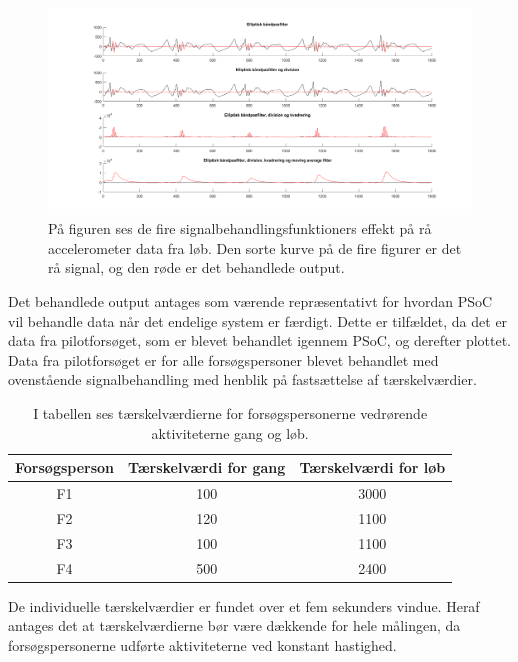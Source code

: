 \begin{figure}[H]
	\centering
	\includegraphics[scale=0.3]{figures/cDesign/signalbehandling_psoc.png}
	\caption{På figuren ses de fire signalbehandlingsfunktioners effekt på rå accelerometer data fra løb. Den sorte kurve på de fire figurer er det rå signal, og den røde er det behandlede output.}
	\label{fig:algoritme_cykling}
\end{figure}

Det behandlede output antages som værende repræsentativt for hvordan PSoC vil behandle data når det endelige system er færdigt. Dette er tilfældet, da det er data fra pilotforsøget, som er blevet behandlet igennem PSoC, og derefter plottet. Data fra pilotforsøget er for alle forsøgspersoner blevet behandlet med ovenstående signalbehandling med henblik på fastsættelse af tærskelværdier. 

\begin{table}[H]
	\centering
	\begin{tabular}{ccc}
		\hline
		\rowcolor[HTML]{C0C0C0} 
		Forsøgsperson & Tærskelværdi for gang & Tærskelværdi for løb \\ \hline
		\rowcolor[HTML]{FFFFFF} 
		F1 & 100 & 3000 \\ \hline
		\rowcolor[HTML]{FFFFFF} 
		F2 & 120 & 1100 \\ \hline
		\rowcolor[HTML]{FFFFFF} 
		F3 & 100 & 1100 \\ \hline
		\rowcolor[HTML]{FFFFFF} 
		F4 & 500 & 2400 \\ \hline
	\end{tabular}
	\caption{I tabellen ses tærskelværdierne for forsøgspersonerne vedrørende aktiviteterne gang og løb.}
	\label{tab:individuel_taerskel}
\end{table}
  
De individuelle tærskelværdier er fundet over et fem sekunders vindue. Heraf antages det at tærskelværdierne bør være dækkende for hele målingen, da forsøgspersonerne udførte aktiviteterne ved konstant hastighed.   


